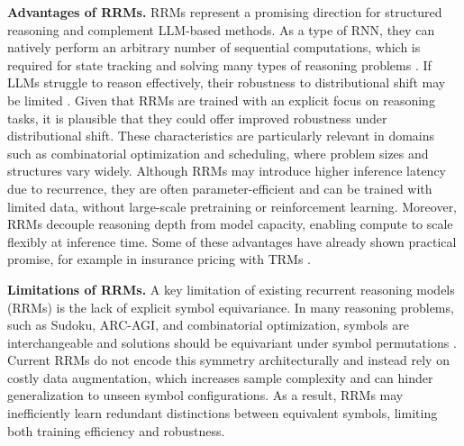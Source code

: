 \documentclass{article}
\theoremstyle{plain}
\theoremstyle{definition}
\theoremstyle{remark}
\renewcommand{\paragraph}[1]{\textbf{#1}\;}
\begin{document}
\paragraph{Advantages of RRMs.}
RRMs represent a promising direction for structured reasoning and complement LLM-based methods. As a type of RNN, they can natively perform an arbitrary number of sequential computations, which is required for state tracking and solving many types of reasoning problems \citep{merrill2025illusionofstate}. If LLMs struggle to reason effectively, their robustness to distributional shift may be limited \citep{kim2025limitations}. Given that RRMs are trained with an explicit focus on reasoning tasks, it is plausible that they could offer improved robustness under distributional shift. These characteristics are particularly relevant in domains such as combinatorial optimization and scheduling, where problem sizes and structures vary widely. Although RRMs may introduce higher inference latency due to recurrence, they are often parameter-efficient and can be trained with limited data, without large-scale pretraining or reinforcement learning. Moreover, RRMs decouple reasoning depth from model capacity, enabling compute to scale flexibly at inference time. Some of these advantages have already shown practical promise, for example in insurance pricing with TRMs \citep{padayachy2026tabtrmtinyrecursivemodel}.

\paragraph{Limitations of RRMs.}
A key limitation of existing recurrent reasoning models (RRMs) is the lack of explicit symbol equivariance. 
In many reasoning problems, such as Sudoku, ARC-AGI, and combinatorial optimization, 
symbols are interchangeable and solutions should be equivariant under symbol permutations 
\citep{cohen2016group,bronstein2017geometric}. 
Current RRMs do not encode this symmetry architecturally and instead rely on costly data augmentation, 
which increases sample complexity and can hinder generalization to unseen symbol configurations. 
As a result, RRMs may inefficiently learn redundant distinctions between equivalent symbols, 
limiting both training efficiency and robustness.
\end{document}
